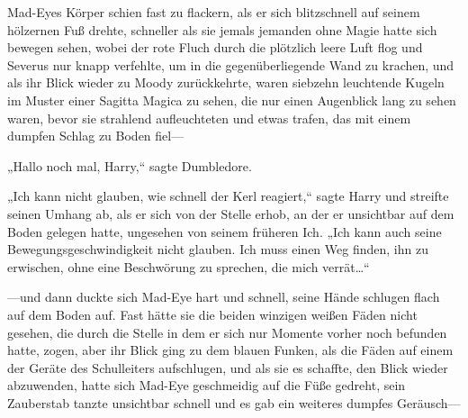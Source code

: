 Mad-Eyes Körper schien fast zu flackern, als er sich blitzschnell auf seinem hölzernen Fuß drehte, schneller als sie jemals jemanden ohne Magie hatte sich bewegen sehen, wobei der rote Fluch durch die plötzlich leere Luft flog und Severus nur knapp verfehlte, um in die gegenüberliegende Wand zu krachen, und als ihr Blick wieder zu Moody zurückkehrte, waren siebzehn leuchtende Kugeln im Muster einer Sagitta Magica zu sehen, die nur einen Augenblick lang zu sehen waren, bevor sie strahlend aufleuchteten und etwas trafen, das mit einem dumpfen Schlag zu Boden fiel—

\later

„Hallo noch mal, Harry,“ sagte Dumbledore.

„Ich kann nicht glauben, wie schnell der Kerl reagiert,“ sagte Harry und streifte seinen Umhang ab, als er sich von der Stelle erhob, an der er unsichtbar auf dem Boden gelegen hatte, ungesehen von seinem früheren Ich. „Ich kann auch seine Bewegungsgeschwindigkeit nicht glauben. Ich muss einen Weg finden, ihn zu erwischen, ohne eine Beschwörung zu sprechen, die mich verrät…“

\later

—und dann duckte sich Mad-Eye hart und schnell, seine Hände schlugen flach auf dem Boden auf. Fast hätte sie die beiden winzigen weißen Fäden nicht gesehen, die durch die Stelle in dem er sich nur Momente vorher noch befunden hatte, zogen, aber ihr Blick ging zu dem blauen Funken, als die Fäden auf einem der Geräte des Schulleiters aufschlugen, und als sie es schaffte, den Blick wieder abzuwenden, hatte sich Mad-Eye geschmeidig auf die Füße gedreht, sein Zauberstab tanzte unsichtbar schnell und es gab ein weiteres dumpfes Geräusch—

